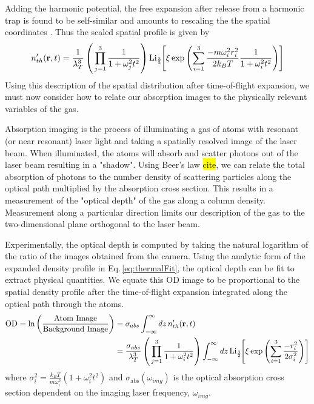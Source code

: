 Adding the harmonic potential, the free expansion after release from a harmonic trap is found to be self-similar and amounts to rescaling the the spatial coordinates \cite{Demarco1998}.
Thus the scaled spatial profile is given by
\begin{equation} \label{eq:thermalFit}
	n_{th}'(\mathbf{r},t) = \frac{1}{\lambda_T^3} 
\left(\, \prod_{j=1}^3 \frac{1}{1+\omega_j^2 t^2} \right) 
\text{Li}_{\scriptscriptstyle\frac{3}{2}\!}\!\left[  \xi \, \text{exp}\left( {\sum_{i=1}^3 \frac{-m\omega_i^2r_i^2}{2k_BT} \frac{1}{1+\omega_i^2t^2}} \right)  \right]
\end{equation}
Using this description of the spatial distribution after time-of-flight expansion, we must now consider how to relate our absorption images to the physically relevant variables of the gas.

Absorption imaging is the process of illuminating a gas of atoms with resonant (or near resonant) laser light and taking a spatially resolved image of the laser beam.
When illuminated, the atoms will absorb and scatter photons out of the laser beam resulting in a "shadow".
Using Beer's law \hl{cite}, we can relate the total absorption of photons to the number density of scattering particles along the optical path multiplied by the absorption cross section. 
This results in a measurement of the "optical depth" of the gas along a column density. 
Measurement along a particular direction limits our description of the gas to the two-dimensional plane orthogonal to the laser beam.

Experimentally, the optical depth is computed by taking the natural logarithm of the ratio of the images obtained from the camera.
Using the analytic form of the expanded density profile in Eq.\,\ref{eq:thermalFit}, the optical depth can be fit to extract physical quantities.
We equate this OD image to be proportional to the spatial density profile after the time-of-flight expansion integrated along the optical path through the atoms.
\begin{equation} \label{eq:polyLogExp}
\begin{split}
	\text{OD} = \text{ln} \left( \frac{\text{Atom Image}}{\text{Background Image}} \right) &= \sigma_{abs} \int_{-\infty}^{\infty} dz \, n_{th}'(\mathbf{r},t) \\ 
&= \frac{\sigma_{abs}}{\lambda_T^3} \left( \, \prod_{j=1}^3 \frac{1}{1+\omega_i^2t^2}\right) \int_{-\infty}^{\infty} dz\,\text{Li}_{\scriptscriptstyle\frac{3}{2}\!}\!\left[ \xi \,\text{exp}\left( {\sum_{i=1}^3 \frac{-r_i^2}{2\sigma_i^2}} \right) \right]
\end{split}
\end{equation}
where $\sigma_i^2 = \frac{k_BT}{m\omega_i^2}(1+\omega_i^2t^2)$ and $\sigma_{\text{abs}}(\omega_{img})$ is the optical absorption cross section dependent on the imaging laser frequency, $\omega_{img}$.

